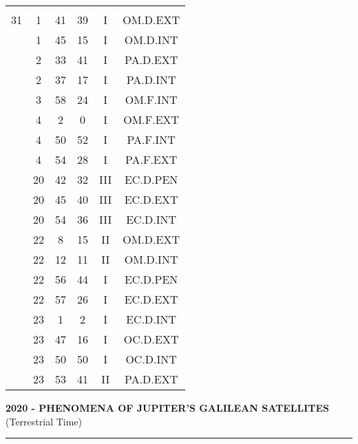 \documentclass[12pt, a4paper]{article}
\begin{document}
\begin{multicols}{3}
{\begin{tabular}{c c c c c c}
	 	 	 	 & & & & & \\%
	 	 	 	31 & 1 & 41 & 39 & I & OM.D.EXT\\%
	 	 	 	 & 1 & 45 & 15 & I & OM.D.INT\\%
	 	 	 	 & 2 & 33 & 41 & I & PA.D.EXT\\%
	 	 	 	 & 2 & 37 & 17 & I & PA.D.INT\\%
	 	 	 	 & 3 & 58 & 24 & I & OM.F.INT\\%
	 	 	 	 & 4 & 2 & 0 & I & OM.F.EXT\\%
	 	 	 	 & 4 & 50 & 52 & I & PA.F.INT\\%
	 	 	 	 & 4 & 54 & 28 & I & PA.F.EXT\\%
	 	 	 	 & 20 & 42 & 32 & III & EC.D.PEN\\%
	 	 	 	 & 20 & 45 & 40 & III & EC.D.EXT\\%
	 	 	 	 & 20 & 54 & 36 & III & EC.D.INT\\%
	 	 	 	 & 22 & 8 & 15 & II & OM.D.EXT\\%
	 	 	 	 & 22 & 12 & 11 & II & OM.D.INT\\%
	 	 	 	 & 22 & 56 & 44 & I & EC.D.PEN\\%
	 	 	 	 & 22 & 57 & 26 & I & EC.D.EXT\\%
	 	 	 	 & 23 & 1 & 2 & I & EC.D.INT\\%
	 	 	 	 & 23 & 47 & 16 & I & OC.D.EXT\\%
	 	 	 	 & 23 & 50 & 50 & I & OC.D.INT\\%
	 	 	 	 & 23 & 53 & 41 & II & PA.D.EXT\\%
	 	 \end{tabular}
 	}
\end{multicols}
\textbf{2020 - PHENOMENA OF JUPITER'S GALILEAN SATELLITES}\\(Terrestrial Time) 
\vspace{0.1cm} \hrule \vspace{0.1cm}
\end{document}
